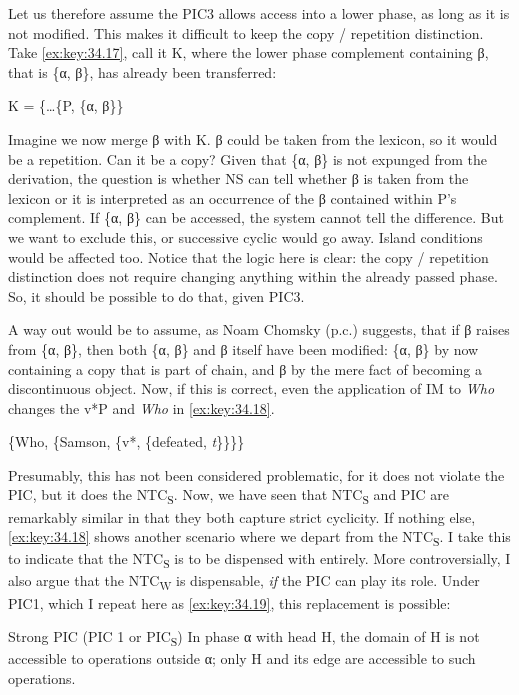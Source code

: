\documentclass[output=paper]{langsci/langscibook}
\begin{document}
Let us therefore assume the PIC3 allows access into a lower phase, as long as
it is not modified. This makes it difficult to keep the copy / repetition
distinction. Take \eqref{ex:key:34.17}, call it K, where the lower phase complement containing
β, that is \{α, β\}, has already been transferred:

\ea%
    \label{ex:key:34.17}K = \{\dots{}\{P, \{α, β\}\}
\z

Imagine we now merge β with K. β could be taken from the lexicon, so it would
be a repetition. Can it be a copy? Given that \{α, β\} is not expunged from the
derivation, the question is whether \gls{NS} can tell whether β is taken from
the lexicon or it is interpreted as an occurrence of the β contained within P’s
complement.  If \{α, β\} can be accessed, the system cannot tell the difference.
But we want to exclude this, or successive cyclic  would go away.
Island conditions would be affected too. Notice that the logic here is clear:
the copy / repetition distinction does not require changing anything within the
already passed phase. So, it should be possible to do that, given
 PIC3.

A way out would be to assume, as Noam Chomsky (p.c.) suggests, that if β raises
from \{α, β\}, then both \{α, β\} and β itself have been modified: \{α, β\} by
now containing a copy that is part of chain, and β by the mere fact of becoming
a discontinuous object. Now, if this is correct, even the application of \gls{IM} to
\emph{Who} changes the v*P and \emph{Who} in \eqref{ex:key:34.18}.

\ea%
    \label{ex:key:34.18}
          \{Who, \{Samson, \{v*, \{defeated, \emph{t}\}\}\}\}
\z

Presumably, this has not been considered problematic, for it does not violate
the \gls{PIC}, but it does the \gls{NTC}\textsubscript{S}. Now, we have seen
that \gls{NTC}\textsubscript{S} and \gls{PIC} are remarkably similar in that
they both capture strict cyclicity. If nothing else, \eqref{ex:key:34.18} shows
another scenario where we depart from the \gls{NTC}\textsubscript{S}. I take
this to indicate that the \gls{NTC}\textsubscript{S} is to be dispensed with
entirely.  More controversially, I also argue that the NTC\textsubscript{W} is
dispensable, \emph{if} the \gls{PIC} can play its role. Under PIC1, which I
repeat here as \eqref{ex:key:34.19}, this replacement is possible:

\ea%
    \label{ex:key:34.19}Strong \gls{PIC} (\gls{PIC} 1 or PIC\textsubscript{S})
    In phase α with head H, the domain of H is not accessible to operations
    outside α; only H and its edge are accessible to such operations.
    \parencite[108]{Chomsky2000}
\z
\end{document}
